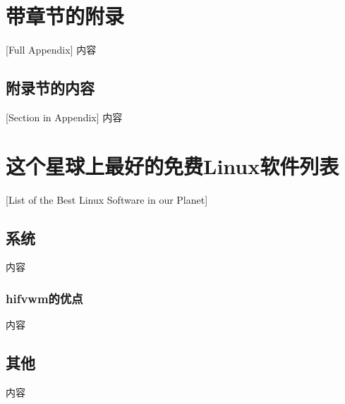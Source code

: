 \chapter{带章节的附录}[Full Appendix]%
内容

\section{附录节的内容}[Section in Appendix]
内容

\chapter{这个星球上最好的免费Linux软件列表}[List of the Best Linux Software in our Planet]
\section{系统}

内容

\subsection{hifvwm的优点}

内容

\section{其他}

内容 
